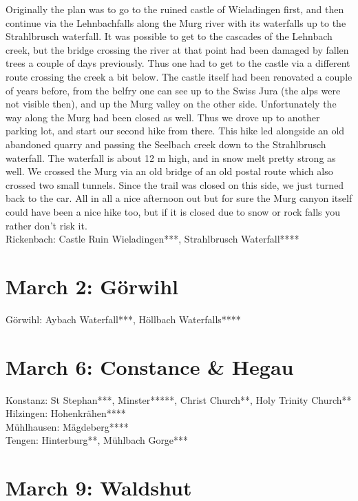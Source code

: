 Originally the plan was to go to the ruined castle of Wieladingen first, and then continue via the Lehnbachfalls along the Murg river with its waterfalls up to the Strahlbrusch waterfall. It was possible to get to the cascades of the Lehnbach creek, but the bridge crossing the river at that point had been damaged by fallen trees a couple of days previously. Thus one had to get to the castle via a different route crossing the creek a bit below. The castle itself had been renovated a couple of years before, from the belfry one can see up to the Swiss Jura (the alps were not visible then), and up the Murg valley on the other side. Unfortunately the way along the Murg had been closed as well. Thus we drove up to another parking lot, and start our second hike from there. This hike led alongside an old abandoned quarry and passing the Seelbach creek down to the Strahlbrusch waterfall. The waterfall is about 12 m high, and in snow melt pretty strong as well. We crossed the Murg via an old bridge of an old postal route which also crossed two small tunnels. Since the trail was closed on this side, we just turned back to the car. All in all a nice afternoon out but for sure the Murg canyon itself could have been a nice hike too, but if it is closed due to snow or rock falls you rather don't risk it.\\

Rickenbach: Castle Ruin Wieladingen***, Strahlbrusch Waterfall****

\section{March 2: G\"orwihl}
\label{2021:Goerwihl}

G\"orwihl: Aybach Waterfall***, H\"ollbach Waterfalls****

\section{March 6: Constance \& Hegau}
\label{2021:Konstanz}

Konstanz: St Stephan***, Minster*****, Christ Church**, Holy Trinity Church**\\
Hilzingen: Hohenkr\"ahen****\\
M\"uhlhausen: M\"agdeberg****\\
Tengen: Hinterburg**, M\"uhlbach Gorge***

\section{March 9: Waldshut}
\label{2021:Waldshut0309}

